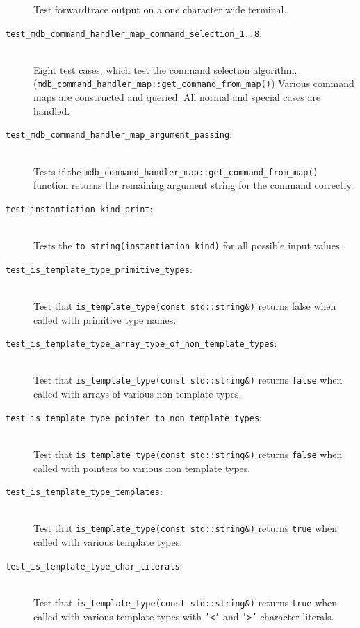 \begin{description}
        Test forwardtrace output on a one character wide terminal.
    \item[\texttt{test\_mdb\_command\_handler\_map\_command\_selection\_1..8}:] \hfill \\
        Eight test cases, which test the command selection algorithm.
        (\texttt{mdb\_command\_handler\_map::get\_command\_from\_map()})
        Various command maps are constructed and queried. All normal and
        special cases are handled.
    \item[\texttt{test\_mdb\_command\_handler\_map\_argument\_passing}:] \hfill \\
        Tests if the
        \texttt{mdb\_command\_handler\_map::get\_command\_from\_map()}
        function returns the remaining argument string for the command
        correctly.
    \item[\texttt{test\_instantiation\_kind\_print}:] \hfill \\
        Tests the \texttt{to\_string(instantiation\_kind)} for all possible
        input values.
    \item[\texttt{test\_is\_template\_type\_primitive\_types}:] \hfill \\
        Test that \texttt{is\_template\_type(const std::string\&)} returns
        false when called with primitive type names.
    \item[\texttt{test\_is\_template\_type\_array\_type\_of\_non\_template\_types}:] \hfill \\
        Test that \texttt{is\_template\_type(const std::string\&)} returns
        \texttt{false} when called with arrays of various non template types.
    \item[\texttt{test\_is\_template\_type\_pointer\_to\_non\_template\_types}:] \hfill \\
        Test that \texttt{is\_template\_type(const std::string\&)} returns
        \texttt{false} when called with pointers to various non template types.
    \item[\texttt{test\_is\_template\_type\_templates}:] \hfill \\
        Test that \texttt{is\_template\_type(const std::string\&)} returns
        \texttt{true} when called with various template types.
    \item[\texttt{test\_is\_template\_type\_char\_literals}:] \hfill \\
        Test that \texttt{is\_template\_type(const std::string\&)} returns
        \texttt{true} when called with various template types with
        \texttt{'<'} and \texttt{'>'} character literals.

\end{description}

